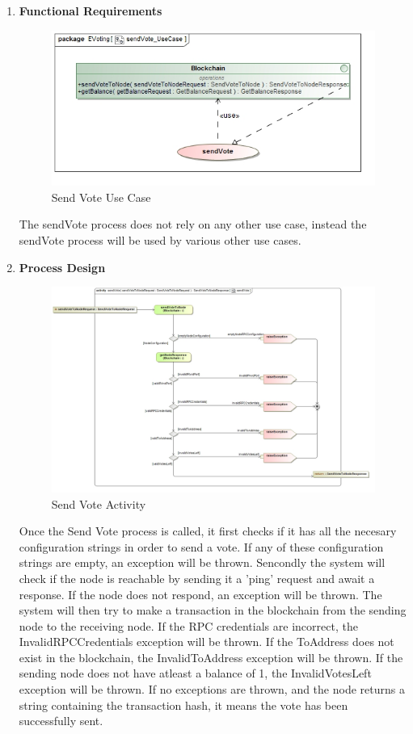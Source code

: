 \begin{enumerate}
\begin{enumerate}
			
			\item \textbf{Functional Requirements}
				\begin{figure}[H]
					\centering
					\includegraphics[width=0.75\linewidth]{../Images/Blockchain/UseCase/sendVote_UseCase.jpg}
					\caption{Send Vote Use Case}
				\end{figure}
				The sendVote process does not rely on any other use case, instead the sendVote process will be used by various other use cases.
				\newline
			\newpage
			\item \textbf{Process Design}
				\begin{figure}[H]
					\centering
					\includegraphics[width=0.75\linewidth]{../Images/Blockchain/Activity/sendVote.jpg}
					\caption{Send Vote Activity}
				\end{figure}
				Once the Send Vote process is called, it first checks if it has all the necesary configuration strings in order to send a vote. If any of these configuration strings are empty, an exception will be thrown. Sencondly the system will check if the node is reachable by sending it a 'ping' request and await a response. If the node does not respond, an exception will be thrown.
				The system will then try to make a transaction in the blockchain from the sending node to the receiving node. If the RPC credentials are incorrect, the InvalidRPCCredentials exception will be thrown. If the ToAddress does not exist in the blockchain, the InvalidToAddress exception will be thrown. If the sending node does not have atleast a balance of 1, the InvalidVotesLeft exception will be thrown. If no exceptions are thrown, and the node returns a string containing the transaction hash, it means the vote has been successfully sent.

\end{enumerate}
\end{enumerate}
